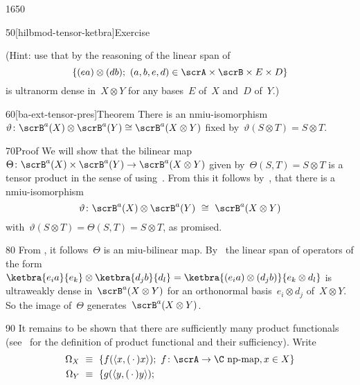 \begin{parsec}{1650}
\begin{point}{50}[hilbmod-tensor-ketbra]{Exercise}
\begin{enumerate}
    (Hint:
    use that by the reasoning of 
    the linear
    span of
    \begin{equation*}
    \{ (e a) \otimes (d b); \ (a,b,e,d) \in \scrA \times \scrB
                    \times E \times D\}
    \end{equation*}
        is ultranorm dense in~$X \otimes Y$
        for any bases~$E$ of~$X$ and~$D$ of~$Y$.)

\end{enumerate}
\spacingfix{}
\end{point}
\begin{point}{60}[ba-ext-tensor-pres]{Theorem}%
There is an
    nmiu-isomorphism~$\vartheta\colon \scrB^a(X) \otimes \scrB^a(Y) \cong \scrB^a(X \otimes Y)$
    fixed by~$\vartheta(S\otimes T) = S \otimes T$.
\begin{point}{70}{Proof}%
We will show that
    the bilinear map~$\Theta \colon 
            \scrB^a(X) \times \scrB^a(Y) \to
    \scrB^a(X \otimes Y)$
    given by~$\Theta(S,T) = S \otimes T$
    is a tensor product in the sense of 
    using~.
From this it follows
    by~,
    that there is a
    nmiu-isomorphism
    \begin{equation*}
    \vartheta\colon \scrB^a(X) \otimes \scrB^a(Y) \ \cong\  \scrB^a(X \otimes Y)
    \end{equation*}
    with~$\vartheta(S\otimes T) = \Theta(S , T) = S \otimes T$, as promised.
\begin{point}{80}%
From , it follows~$\Theta$ is an miu-bilinear map.
By~
    the linear span of operators of the form~$
        \ketbra{e_i a}{e_k} \otimes \ketbra{d_j b }{d_l}
        = \ketbra{(e_i a) \otimes (d_j b)}{e_k \otimes d_l} $
        is ultraweakly dense in~$\scrB^a(X \otimes Y)$
        for an orthonormal basis~$e_i \otimes d_j$ of~$X \otimes Y$.
        So the image of~$\Theta$ generates~$\scrB^a(X\otimes Y)$.
\begin{point}{90}%
    It remains to be shown that there are sufficiently many product functionals
    (see~ for the definition of product functional
    and their sufficiency).
    Write
    \begin{align*}
        \Omega_X &\ \equiv \ 
                    \{ f(\langle x, (\,\cdot\,) x \rangle);
                    \ f \colon \scrA \to \C \text{ np-map}, x\in X \} \\
        \Omega_Y& \  \equiv\ 
                    \{ g(\langle y, (\,\cdot\,) y \rangle);

\end{align*}
\end{point}
\end{point}
\end{point}
\end{point}
\end{parsec}
